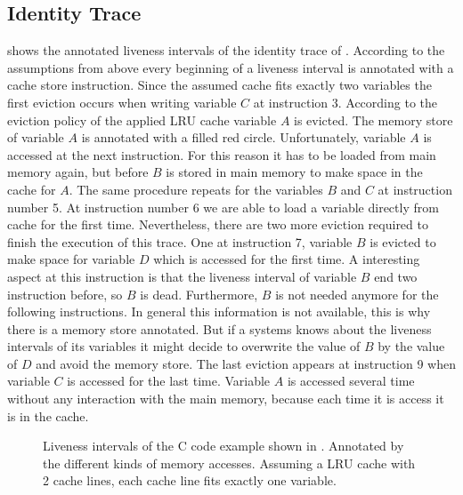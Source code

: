 \documentclass[onecolumn, openright, master, english, signatures]{dbrgrptt}
\begin{document}
\subsection{Identity Trace}
 shows the annotated liveness intervals of the identity \ac{trace} of . According to the assumptions from above every beginning of a liveness interval is annotated with a cache store instruction. Since the assumed cache fits exactly two variables the first eviction occurs when writing variable $C$ at instruction 3. According to the eviction policy of the applied \ac{LRU} cache variable $A$ is evicted. The memory store of variable $A$ is annotated with a filled red circle. Unfortunately, variable $A$ is accessed at the next instruction. For this reason it has to be loaded from main memory again, but before $B$ is stored in main memory to make space in the cache for $A$. The same procedure repeats for the variables $B$ and $C$ at instruction number 5. At instruction number 6 we are able to load a variable directly from cache for the first time. Nevertheless, there are two more eviction required to finish the execution of this trace. One at instruction 7, variable $B$ is evicted to make space for variable $D$ which is accessed for the first time. A interesting aspect at this instruction is that the liveness interval of variable $B$ end two instruction before, so $B$ is dead. Furthermore, $B$ is not needed anymore for the following instructions. In general this information is not available, this is why there is a memory store annotated. But if a systems knows about the liveness intervals of its variables it might decide to overwrite the value of $B$ by the value of $D$ and avoid the memory store. The last eviction appears at instruction 9 when variable $C$ is accessed for the last time. Variable $A$ is accessed several time without any interaction with the main memory, because each time it is access it is in the cache.

\begin{figure}[!ht]
  \centering
  
  \caption{Liveness intervals of the C code example shown in . Annotated by the different kinds of memory accesses. Assuming a LRU cache with 2 cache lines, each cache line fits exactly one variable.}
  \label{fig:trace-transformation-original-marked}
\end{figure}
\end{document}
